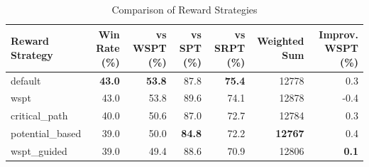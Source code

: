 \begin{table}[htbp]%
\centering%
\begin{tabular}{lrrrrrr}%
\toprule%
\textbf{Reward Strategy}&\textbf{Win Rate (\%)}&\textbf{vs WSPT (\%)}&\textbf{vs SPT (\%)}&\textbf{vs SRPT (\%)}&\textbf{Weighted Sum}&\textbf{Improv. WSPT (\%)}\\%
\midrule%
default&\textbf{43.0}&\textbf{53.8}&87.8&\textbf{75.4}&12778&0.3\\%
wspt&43.0&53.8&89.6&74.1&12878&-0.4\\%
critical_path&40.0&50.6&87.0&72.7&12784&0.3\\%
potential_based&39.0&50.0&\textbf{84.8}&72.2&\textbf{12767}&0.4\\%
wspt_guided&39.0&49.4&88.6&70.9&12806&\textbf{0.1}\\%
\bottomrule%
\end{tabular}%
\caption{Comparison of Reward Strategies}%
\label{tab:rewards}%
\end{table}